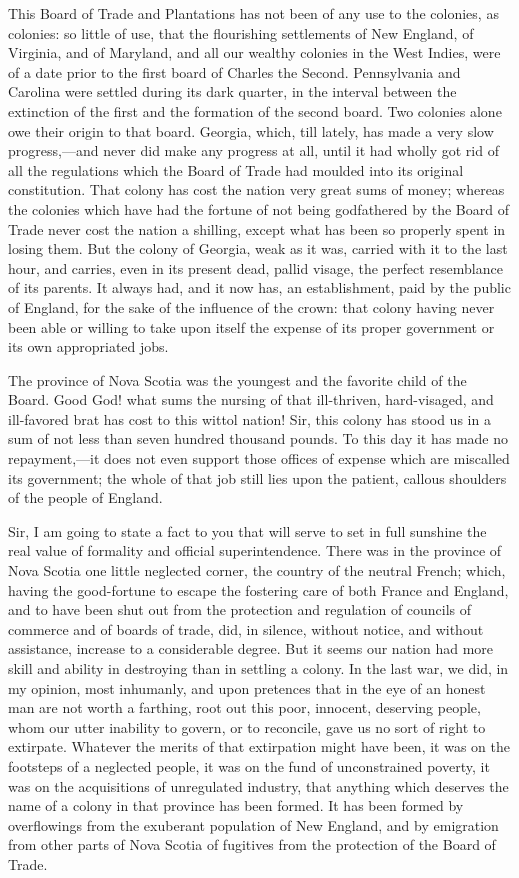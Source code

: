 This Board of Trade and Plantations has not been of any use to the colonies, as colonies: so little of use, that the flourishing settlements of New England, of Virginia, and of Maryland, and all our wealthy colonies in the West Indies, were of a date prior to the first board of Charles the Second. Pennsylvania and Carolina were settled during its dark quarter, in the interval between the extinction of the first and the formation of the second board. Two colonies alone owe their origin to that board. Georgia, which, till lately, has made a very slow progress,—and never did make any progress at all, until it had wholly got rid of all the regulations which the Board of Trade had moulded into its original constitution. That colony has cost the nation very great sums of money; whereas the colonies which have had the fortune of not being godfathered by the Board of Trade never cost the nation a shilling, except what has been so properly spent in losing them. But the colony of Georgia, weak as it was, carried with it to the last hour, and carries, even in its present dead, pallid visage, the perfect resemblance of its parents. It always had, and it now has, an establishment, paid by the public of England, for the sake of the influence of the crown: that colony having never been able or willing to take upon itself the expense of its proper government or its own appropriated jobs.

The province of Nova Scotia was the youngest and the favorite child of the Board. Good God! what sums the nursing of that ill-thriven, hard-visaged, and ill-favored brat has cost to this wittol nation! Sir, this colony has stood us in a sum of not less than seven hundred thousand pounds. To this day it has made no repayment,—it does not even support those offices of expense which are miscalled its government; the whole of that job still lies upon the patient, callous shoulders of the people of England.

Sir, I am going to state a fact to you that will serve to set in full sunshine the real value of formality and official superintendence. There was in the province of Nova Scotia one little neglected corner, the country of the neutral French; which, having the good-fortune to escape the fostering care of both France and England, and to have been shut out from the protection and regulation of councils of commerce and of boards of trade, did, in silence, without notice, and without assistance, increase to a considerable degree. But it seems our nation had more skill and ability in destroying than in settling a colony. In the last war, we did, in my opinion, most inhumanly, and upon pretences that in the eye of an honest man are not worth a farthing, root out this poor, innocent, deserving people, whom our utter inability to govern, or to reconcile, gave us no sort of right to extirpate. Whatever the merits of that extirpation might have been, it was on the footsteps of a neglected people, it was on the fund of unconstrained poverty, it was on the acquisitions of unregulated industry, that anything which deserves the name of a colony in that province has been formed. It has been formed by overflowings from the exuberant population of New England, and by emigration from other parts of Nova Scotia of fugitives from the protection of the Board of Trade.

